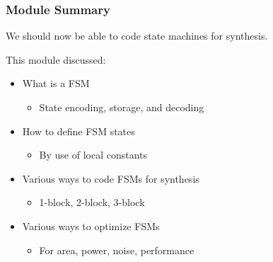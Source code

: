 \documentclass[t, notes, xcolor=table]{beamer}
\begin{document}
\begin{frame}
\frametitle{Module Summary}
We should now be able to code state machines for synthesis.
\newline

This module discussed:
\begin{itemize}
\item What is a FSM
\begin{itemize}
	\item State encoding, storage, and decoding
\end{itemize}
\item How to define FSM states
\begin{itemize}
	\item By use of local constants
\end{itemize}
\item Various ways to code FSMs for synthesis
\begin{itemize}
	\item 1-block, 2-block, 3-block
\end{itemize}
\item Various ways to optimize FSMs
\begin{itemize}
	\item For area, power, noise, performance
\end{itemize}
\end{itemize}
\end{frame}
\end{document}
